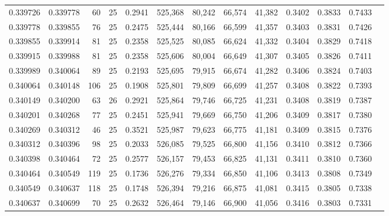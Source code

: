 \begin{tabular}{rrrrrrrrrrrrr}
0.339726 & 0.339778 &    60 &  25 &                                     0.2941 & 525,368 &  80,242 &  66,574 &  41,382 & 0.3402 & 0.3833 & 0.7433 \\
0.339778 & 0.339855 &    76 &  25 &                                     0.2475 & 525,444 &  80,166 &  66,599 &  41,357 & 0.3403 & 0.3831 & 0.7426 \\
0.339855 & 0.339914 &    81 &  25 &                                     0.2358 & 525,525 &  80,085 &  66,624 &  41,332 & 0.3404 & 0.3829 & 0.7418 \\
0.339915 & 0.339988 &    81 &  25 &                                     0.2358 & 525,606 &  80,004 &  66,649 &  41,307 & 0.3405 & 0.3826 & 0.7411 \\
0.339989 & 0.340064 &    89 &  25 &                                     0.2193 & 525,695 &  79,915 &  66,674 &  41,282 & 0.3406 & 0.3824 & 0.7403 \\
0.340064 & 0.340148 &   106 &  25 &                                     0.1908 & 525,801 &  79,809 &  66,699 &  41,257 & 0.3408 & 0.3822 & 0.7393 \\
0.340149 & 0.340200 &    63 &  26 &                                     0.2921 & 525,864 &  79,746 &  66,725 &  41,231 & 0.3408 & 0.3819 & 0.7387 \\
0.340201 & 0.340268 &    77 &  25 &                                     0.2451 & 525,941 &  79,669 &  66,750 &  41,206 & 0.3409 & 0.3817 & 0.7380 \\
0.340269 & 0.340312 &    46 &  25 &                                     0.3521 & 525,987 &  79,623 &  66,775 &  41,181 & 0.3409 & 0.3815 & 0.7376 \\
0.340312 & 0.340396 &    98 &  25 &                                     0.2033 & 526,085 &  79,525 &  66,800 &  41,156 & 0.3410 & 0.3812 & 0.7366 \\
0.340398 & 0.340464 &    72 &  25 &                                     0.2577 & 526,157 &  79,453 &  66,825 &  41,131 & 0.3411 & 0.3810 & 0.7360 \\
0.340464 & 0.340549 &   119 &  25 &                                     0.1736 & 526,276 &  79,334 &  66,850 &  41,106 & 0.3413 & 0.3808 & 0.7349 \\
0.340549 & 0.340637 &   118 &  25 &                                     0.1748 & 526,394 &  79,216 &  66,875 &  41,081 & 0.3415 & 0.3805 & 0.7338 \\
0.340637 & 0.340699 &    70 &  25 &                                     0.2632 & 526,464 &  79,146 &  66,900 &  41,056 & 0.3416 & 0.3803 & 0.7331 \\

\end{tabular}
